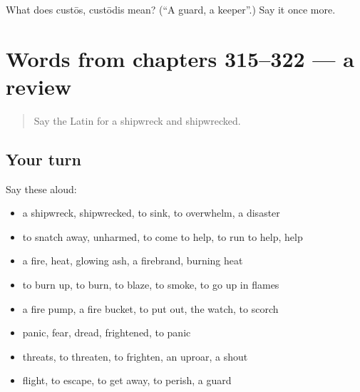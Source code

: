 \begin{tcolorbox}[breakable,colback=teal!4,colframe=teal!35!black,title={Before you move on}]
What does custōs, custōdis mean? (\textquotedblleft{}A guard, a keeper\textquotedblright{}.) Say it once more.
\end{tcolorbox}
\section[(dialogue)]{Words from chapters 315–322 — a review}

\label{lesson:LA-R322-review-315-322}



\begin{quote}
Say the Latin for a shipwreck and shipwrecked.
\end{quote}

\subsection*{Your turn}
Say these aloud:

\begin{itemize}
\raggedright
  \item a shipwreck, shipwrecked, to sink, to overwhelm, a disaster
  \item to snatch away, unharmed, to come to help, to run to help, help
  \item a fire, heat, glowing ash, a firebrand, burning heat
  \item to burn up, to burn, to blaze, to smoke, to go up in flames
  \item a fire pump, a fire bucket, to put out, the watch, to scorch
  \item panic, fear, dread, frightened, to panic
  \item threats, to threaten, to frighten, an uproar, a shout
  \item flight, to escape, to get away, to perish, a guard
\end{itemize}


